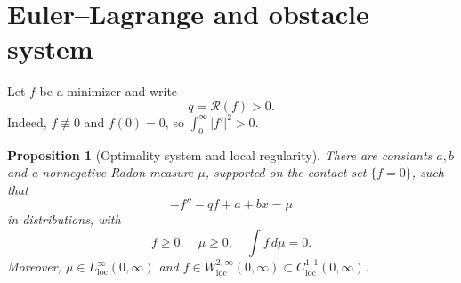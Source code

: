 \documentclass[11pt]{article}
\newtheorem{proposition}[theorem]{Proposition}
\theoremstyle{definition}
\theoremstyle{remark}
\newcommand{\Rcal}{\mathcal R}
\begin{document}
\section{Euler--Lagrange and obstacle system}
Let $f$ be a minimizer and write
\[
 q=\Rcal(f)>0.
\]
Indeed, $f\not\equiv0$ and $f(0)=0$, so $\int_0^\infty |f'|^2>0$.

\begin{proposition}[Optimality system and local regularity]\label{prop:obstacle}
There are constants $a,b$ and a nonnegative Radon measure $\mu$, supported on the contact set $\{f=0\}$, such that
\begin{equation}\label{eq:kkt}
 -f''-qf+a+bx=\mu
\end{equation}
in distributions, with
\[
 f\geq0,
 \quad \mu\geq0,
 \quad \int f\,d\mu=0.
\]
Moreover, $\mu\in L^\infty_{\mathrm{loc}}(0,\infty)$ and
$f\in W^{2,\infty}_{\mathrm{loc}}(0,\infty)\subset C^{1,1}_{\mathrm{loc}}(0,\infty)$.
\end{proposition}
\end{document}
